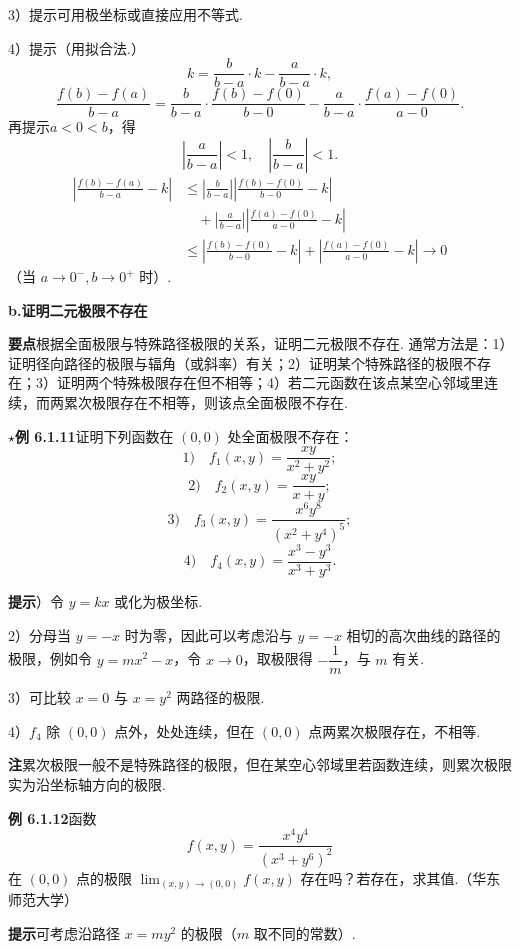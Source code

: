 \documentclass[UTF8, 12pt, fontset=fandol, oneside]{ctexart}
\begin{document}
3）提示\quad 可用极坐标或直接应用不等式.

4）提示\quad （用拟合法.）
\[
  k=\frac{b}{b-a}\cdot k-\frac{a}{b-a}\cdot k,
\]
\[
  \frac{f(b)-f(a)}{b-a}
  =\frac{b}{b-a}\cdot\frac{f(b)-f(0)}{b-0}
  -\frac{a}{b-a}\cdot\frac{f(a)-f(0)}{a-0}.
\]
再提示\quad $a<0<b$，得
\[
  \left|\frac{a}{b-a}\right|<1,\quad
  \left|\frac{b}{b-a}\right|<1.
\]
\[
\begin{aligned}
\left|\frac{f(b)-f(a)}{b-a}-k\right|
&\le \left|\frac{b}{b-a}\right|
\left|\frac{f(b)-f(0)}{b-0}-k\right|\\
&\quad+\left|\frac{a}{b-a}\right|
\left|\frac{f(a)-f(0)}{a-0}-k\right|\\
&\le \left|\frac{f(b)-f(0)}{b-0}-k\right|
+\left|\frac{f(a)-f(0)}{a-0}-k\right|\to0
\end{aligned}
\]
（当 $a\to0^-,b\to0^+$ 时）.

\noindent\textbf{b.\quad 证明二元极限不存在}

\noindent\textbf{要点}\quad 根据全面极限与特殊路径极限的关系，证明二元极限不存在. 通常方法是：1）证明径向路径的极限与辐角（或斜率）有关；2）证明某个特殊路径的极限不存在；3）证明两个特殊极限存在但不相等；4）若二元函数在该点某空心邻域里连续，而两累次极限存在不相等，则该点全面极限不存在.

\noindent\textbf{$\star$例 6.1.11}\quad 证明下列函数在 $(0,0)$ 处全面极限不存在：
\[
  1)\quad f_1(x,y)=\frac{xy}{x^2+y^2};
\]
\[
  2)\quad f_2(x,y)=\frac{xy}{x+y};
\]
\[
  3)\quad f_3(x,y)=\frac{x^6y^8}{(x^2+y^4)^5};
\]
\[
  4)\quad f_4(x,y)=\frac{x^3-y^3}{x^3+y^3}.
\]

\noindent\textbf{提示}）令 $y=kx$ 或化为极坐标.

2）分母当 $y=-x$ 时为零，因此可以考虑沿与 $y=-x$ 相切的高次曲线的路径的极限，例如令 $y=mx^2-x$，令 $x\to0$，取极限得 $-\dfrac1m$，与 $m$ 有关.

3）可比较 $x=0$ 与 $x=y^2$ 两路径的极限.

4）$f_4$ 除 $(0,0)$ 点外，处处连续，但在 $(0,0)$ 点两累次极限存在，不相等.

\noindent\textbf{注}\quad 累次极限一般不是特殊路径的极限，但在某空心邻域里若函数连续，则累次极限实为沿坐标轴方向的极限.

\noindent\textbf{例 6.1.12}\quad 函数
\[
  f(x,y)=\frac{x^4y^4}{(x^3+y^6)^2}
\]
在 $(0,0)$ 点的极限 $\displaystyle\lim_{(x,y)\to(0,0)}f(x,y)$ 存在吗？若存在，求其值.（华东师范大学）

\noindent\textbf{提示}\quad 可考虑沿路径 $x=my^2$ 的极限（$m$ 取不同的常数）.
\end{document}
